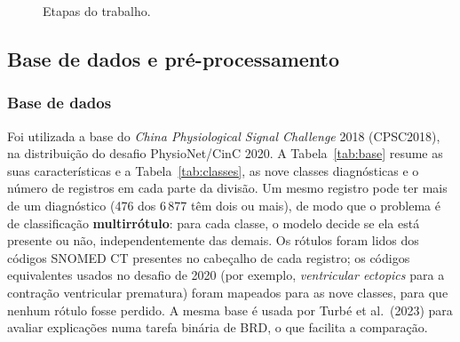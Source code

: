 \documentclass[11pt,a4paper]{article}
\newcommand{\fonte}[1]{\par\vspace{2pt}{\centering\footnotesize Fonte: #1\par}}
\begin{document}
\begin{figure}[H]\centering
\caption{Etapas do trabalho.}\label{fig:pipeline}
\fonte{Elaborado pelo autor.}
\end{figure}

\subsection{Base de dados e pré-processamento}\label{sec:dados}

\subsubsection{Base de dados}
Foi utilizada a base do \textit{China Physiological Signal Challenge} 2018 (CPSC2018), na distribuição do desafio PhysioNet/CinC 2020. A Tabela~\ref{tab:base} resume as suas características e a Tabela~\ref{tab:classes}, as nove classes diagnósticas e o número de registros em cada parte da divisão. Um mesmo registro pode ter mais de um diagnóstico (476 dos 6\,877 têm dois ou mais), de modo que o problema é de classificação \textbf{multirrótulo}: para cada classe, o modelo decide se ela está presente ou não, independentemente das demais. Os rótulos foram lidos dos códigos SNOMED CT presentes no cabeçalho de cada registro; os códigos equivalentes usados no desafio de 2020 (por exemplo, \textit{ventricular ectopics} para a contração ventricular prematura) foram mapeados para as nove classes, para que nenhum rótulo fosse perdido. A mesma base é usada por Turbé et al.\ (2023) para avaliar explicações numa tarefa binária de BRD, o que facilita a comparação.
\end{document}
